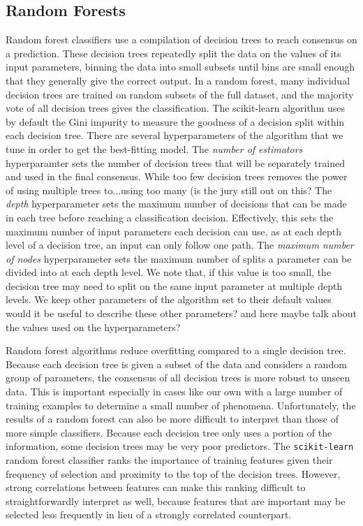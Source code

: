 \documentclass[fleqn,usenatbib]{mnras}
\newcommand\khb[1]{{\color{blue}#1}}
\newcommand\edits[1]{{\color{red}#1}}
\begin{document}
\subsection{Random Forests}
\label{sec:rf} %
Random forest classifiers use a compilation of decision trees to reach consensus on a prediction. These decision trees repeatedly split the data on the values of its input parameters, binning the data into small subsets until bins are small enough that they generally give the correct output. In a random forest, many individual decision trees are trained on random subsets of the full dataset, and the majority vote of all decision trees gives the classification. The scikit-learn algorithm uses by default the Gini impurity to measure the goodness of a decision split within each decision tree. There are several hyperparameters of the algorithm that we tune in order to get the best-fitting model. The \textit{number of estimators} hyperparamter sets the number of decision trees that will be separately trained and used in the final consensus. \edits{While too few decision trees removes the power of using multiple trees to...using too many (is the jury still out on this?} The \textit{depth} hyperparameter sets the maximum number of decisions that can be made in each tree before reaching a classification decision. Effectively, this sets the maximum number of input parameters each decision can use, as at each depth level of a decision tree, an input can only follow one path. The \textit{maximum number of nodes} hyperparameter sets the maximum number of splits a parameter can be divided into at each depth level. We note that, if this value is too small, the decision tree may need to split on the same input parameter at multiple depth levels. We keep other parameters of the algorithm set to their default values \khb{would it be useful to describe these other parameters? and here maybe talk about the values used on the hyperparameters?}

Random forest algorithms reduce overfitting compared to a single decision tree. Because each decision tree is given a subset of the data and considers a random group of parameters, the consensus of all decision trees is more robust to unseen data. This is important especially in cases like our own with a large number of training examples to determine a small number of phenomena. Unfortunately, the results of a random forest can also be more difficult to interpret than those of more simple classifiers. Because each decision tree only uses a portion of the information, some decision trees may be very poor predictors. The \texttt{scikit-learn} random forest classifier ranks the importance of training features given their frequency of selection and proximity to the top of the decision trees. However, strong correlations between features can make this ranking difficult to straightforwardly interpret as well, because features that are important may be selected less frequently in lieu of a strongly correlated counterpart.
\end{document}
